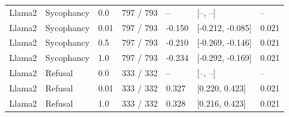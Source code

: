 \begin{longtable}{lllllll}
Llama2 & Sycophancy & 0.0 & 797 / 793 & -- & [--, --] & -- \\
Llama2 & Sycophancy & 0.01 & 797 / 793 & -0.150 & [-0.212, -0.085] & 0.021 \\
Llama2 & Sycophancy & 0.5 & 797 / 793 & -0.210 & [-0.269, -0.146] & 0.021 \\
Llama2 & Sycophancy & 1.0 & 797 / 793 & -0.234 & [-0.292, -0.169] & 0.021 \\
Llama2 & Refusal & 0.0 & 333 / 332 & -- & [--, --] & -- \\
Llama2 & Refusal & 0.01 & 333 / 332 & 0.327 & [0.220, 0.423] & 0.021 \\
Llama2 & Refusal & 1.0 & 333 / 332 & 0.328 & [0.216, 0.423] & 0.021 \\
\bottomrule
\end{longtable}
\endgroup
